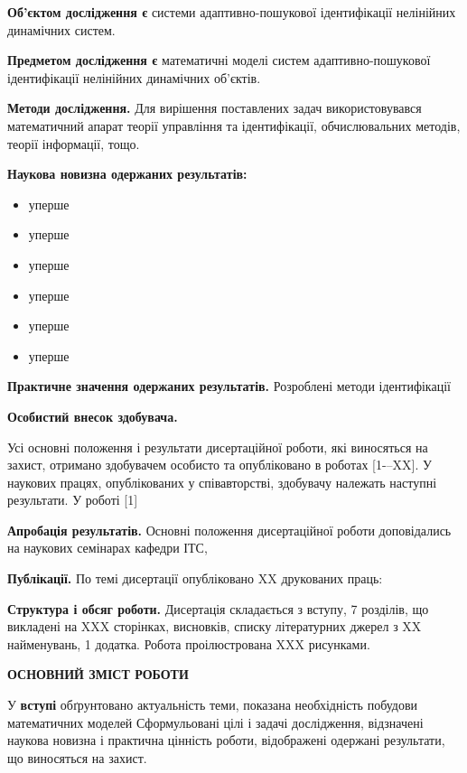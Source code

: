 \documentclass[a4paper,12pt]{atuaref}
\newcommand{\xsect}[1]{\medskip\begin{center}\textbf{#1}\end{center}\medskip\penalty10000}
\begin{document}
\textbf{Об'єктом дослідження є}
системи адаптивно-пошукової ідентифікації нелінійних динамічних систем.

\smallskip
\textbf{Предметом дослідження є}
математичні моделі систем адаптивно-пошукової ідентифікації
нелінійних динамічних об'єктів.

\smallskip
\textbf{Методи дослідження.}
Для вирішення поставлених задач
використовувався математичний апарат
теорії управління та ідентифікації,
обчислювальних методів,
теорії інформації, тощо.

\smallskip
\textbf{Наукова новизна одержаних результатів:}
\begin{itemize}

\item уперше

\item уперше

\item уперше

\item уперше

\item уперше

\item уперше


\end{itemize}


\smallskip
\textbf{Практичне значення одержаних результатів.}
Розроблені методи ідентифікації

\smallskip
\textbf{Особистий внесок здобувача.}

Усі основні положення і результати
дисертаційної роботи, які виносяться на захист, отримано здобувачем особисто та
опубліковано в роботах [1-–XX]. У наукових працях, опублікованих у співавторстві,
здобувачу належать наступні результати. У роботі [1]



\smallskip
\textbf{Апробація результатів.}
Основні положення дисертаційної роботи доповідались на наукових
семінарах кафедри ІТС,

\smallskip
\textbf{Публікації.}
По темі дисертації опубліковано
XX друкованих праць:

\smallskip
\textbf{Структура і обсяг роботи.}
Дисертація складається з вступу, 7 розділів, що викладені на
XXX сторінках, висновків, списку літературних джерел з
XX найменувань,
1 додатка.
Робота проілюстрована XXX рисунками.


\xsect{ОСНОВНИЙ ЗМІСТ РОБОТИ}

У \textbf{вступі} обґрунтовано актуальність теми,
показана необхідність побудови
математичних моделей  Сформульовані цілі і задачі дослідження,
відзначені наукова новизна і практична цінність роботи, відображені
одержані результати, що виносяться на захист.
\end{document}
